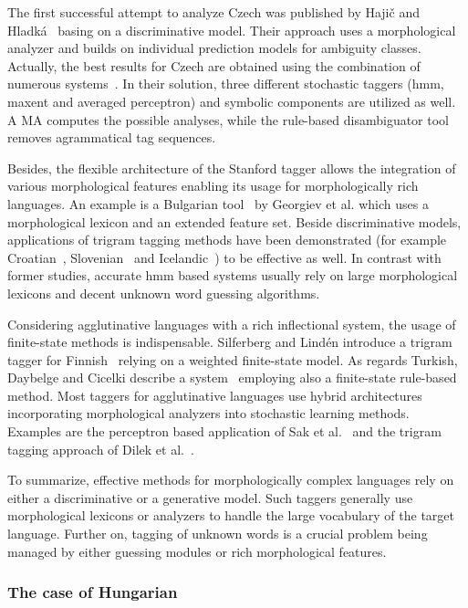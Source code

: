The first successful attempt to analyze Czech was published by Hajič and Hladká~\cite{Hajic1998a} basing on a discriminative model.
Their approach uses a morphological analyzer and builds on individual prediction models for ambiguity classes.
Actually, the best results for Czech are obtained using the combination of numerous systems~\cite{Hajic2007}.
In their solution, three different stochastic taggers (\acrshort{hmm}, \acrlong{maxent} and averaged perceptron) and symbolic components are utilized as well.
A MA computes the possible analyses, while the rule-based disambiguator tool removes agrammatical tag sequences. 

Besides, the flexible architecture of the Stanford tagger \cite{Toutanova2003} allows the integration of various morphological features enabling its usage for morphologically rich languages.
An example is a Bulgarian tool~\cite{Georgiev2012} by Georgiev et al. which uses a morphological lexicon and an extended feature set.
Beside discriminative models, applications of trigram tagging methods \cite{Brants2000,Halacsy2007} have been demonstrated (for example Croatian~\cite{Agic2013}, Slovenian~\cite{Agic2013} and Icelandic~\cite{Loftsson2007}) to be effective as well.
In contrast with former studies, accurate \acrlong{hmm} based systems usually rely on large morphological lexicons and decent unknown word guessing algorithms.

Considering agglutinative languages with a rich inflectional system, the usage of finite-state methods is indispensable.
Silferberg and Lindén introduce a trigram tagger for Finnish~\cite{Silfverberg2011} relying on a weighted finite-state model.
As regards Turkish, Daybelge and Cicelki describe a system~\cite{Daybelge2007} employing also a finite-state rule-based method.
Most taggers for agglutinative languages use hybrid architectures incorporating morphological analyzers into stochastic learning methods.
Examples are the perceptron based application of Sak et al.~\cite{Sak2007} and the trigram tagging approach of Dilek et al.~\cite{Hakkani-Tur2002}.

To summarize, effective methods for morphologically complex languages rely on either a discriminative or a generative model.
Such taggers generally use morphological lexicons or analyzers to handle the large vocabulary of the target language.
Further on, tagging of unknown words is a crucial problem being managed by either guessing modules or rich morphological features. 

\subsubsection{The case of Hungarian}

